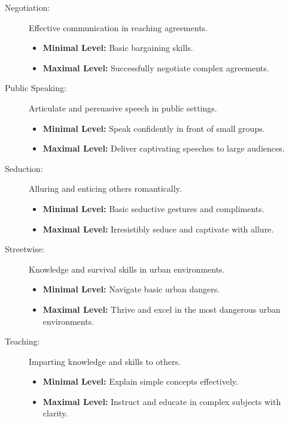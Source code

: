 \documentclass[12pt]{book}
\begin{document}
\begin{description}
    \item[Negotiation:] Effective communication in reaching agreements.
        \begin{itemize}
            \item \textbf{Minimal Level:} Basic bargaining skills.
            \item \textbf{Maximal Level:} Successfully negotiate complex agreements.
        \end{itemize}

    \item[Public Speaking:] Articulate and persuasive speech in public settings.
        \begin{itemize}
            \item \textbf{Minimal Level:} Speak confidently in front of small groups.
            \item \textbf{Maximal Level:} Deliver captivating speeches to large audiences.
        \end{itemize}

    \item[Seduction:] Alluring and enticing others romantically.
        \begin{itemize}
            \item \textbf{Minimal Level:} Basic seductive gestures and compliments.
            \item \textbf{Maximal Level:} Irresistibly seduce and captivate with allure.
        \end{itemize}

    \item[Streetwise:] Knowledge and survival skills in urban environments.
        \begin{itemize}
            \item \textbf{Minimal Level:} Navigate basic urban dangers.
            \item \textbf{Maximal Level:} Thrive and excel in the most dangerous urban environments.
        \end{itemize}

    \item[Teaching:] Imparting knowledge and skills to others.
        \begin{itemize}
            \item \textbf{Minimal Level:} Explain simple concepts effectively.
            \item \textbf{Maximal Level:} Instruct and educate in complex subjects with clarity.
        \end{itemize}


\end{description}
\end{document}
